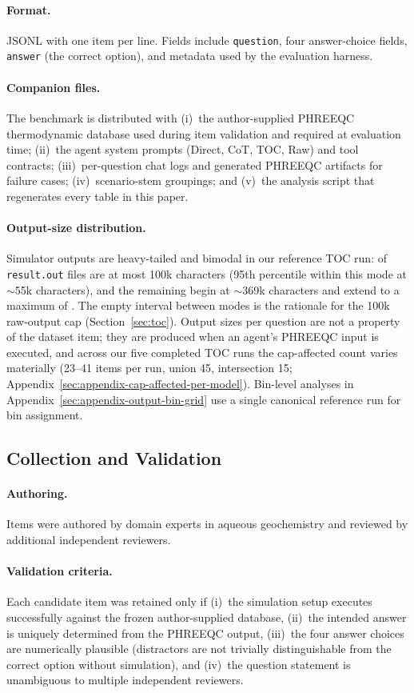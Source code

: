 \documentclass{article}
\begin{document}
\paragraph{Format.}
JSONL with one item per line. Fields include \texttt{question}, four answer-choice fields, \texttt{answer} (the correct option), and metadata used by the evaluation harness.

\paragraph{Companion files.}
The benchmark is distributed with (i)~the author-supplied PHREEQC thermodynamic database used during item validation and required at evaluation time; (ii)~the agent system prompts (Direct, CoT, TOC, Raw) and tool contracts; (iii)~per-question chat logs and generated PHREEQC artifacts for failure cases; (iv)~scenario-stem groupings; and (v)~the analysis script that regenerates every table in this paper.

\paragraph{Output-size distribution.}
Simulator outputs are heavy-tailed and bimodal in our reference TOC run: \OutputLeHundredK{} of \texttt{result.out} files are at most 100k characters (95th percentile within this mode at $\sim$55k characters), and the remaining \OutputGtHundredK{} begin at $\sim$369k characters and extend to a maximum of \OutputMaxChars. The empty interval between modes is the rationale for the 100k raw-output cap (Section~\ref{sec:toc}). Output sizes per question are not a property of the dataset item; they are produced when an agent's PHREEQC input is executed, and across our five completed TOC runs the cap-affected count varies materially (23--41 items per run, union 45, intersection 15; Appendix~\ref{sec:appendix-cap-affected-per-model}). Bin-level analyses in Appendix~\ref{sec:appendix-output-bin-grid} use a single canonical reference run for bin assignment.

\subsection{Collection and Validation}

\paragraph{Authoring.}
Items were authored by domain experts in aqueous geochemistry and reviewed by additional independent reviewers.

\paragraph{Validation criteria.}
Each candidate item was retained only if (i)~the simulation setup executes successfully against the frozen author-supplied database, (ii)~the intended answer is uniquely determined from the PHREEQC output, (iii)~the four answer choices are numerically plausible (distractors are not trivially distinguishable from the correct option without simulation), and (iv)~the question statement is unambiguous to multiple independent reviewers.


\end{document}
